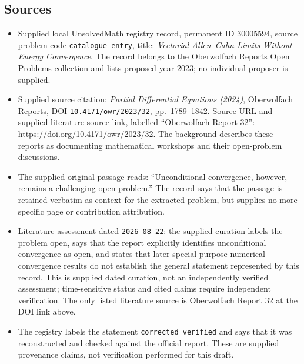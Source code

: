 \documentclass[11pt]{article}
\begin{document}
\subsection{Sources}
\begin{itemize}
\item Supplied local UnsolvedMath registry record, permanent ID \(30005594\), source problem code \texttt{catalogue entry}, title: \emph{Vectorial Allen--Cahn Limits Without Energy Convergence}. The record belongs to the Oberwolfach Reports Open Problems collection and lists proposed year 2023; no individual proposer is supplied.
\item Supplied source citation: \emph{Partial Differential Equations (2024)}, Oberwolfach Reports, DOI \texttt{10.4171/owr/2023/32}, pp.\ 1789--1842. Source URL and supplied literature-source link, labelled ``Oberwolfach Report 32'': \url{https://doi.org/10.4171/owr/2023/32}. The background describes these reports as documenting mathematical workshops and their open-problem discussions.
\item The supplied original passage reads: ``Unconditional convergence, however, remains a challenging open problem.'' The record says that the passage is retained verbatim as context for the extracted problem, but supplies no more specific page or contribution attribution.
\item Literature assessment dated \texttt{2026-08-22}: the supplied curation labels the problem open, says that the report explicitly identifies unconditional convergence as open, and states that later special-purpose numerical convergence results do not establish the general statement represented by this record. This is supplied dated curation, not an independently verified assessment; time-sensitive status and cited claims require independent verification. The only listed literature source is Oberwolfach Report 32 at the DOI link above.
\item The registry labels the statement \texttt{corrected\_verified} and says that it was reconstructed and checked against the official report. These are supplied provenance claims, not verification performed for this draft.
\end{itemize}
\end{document}
